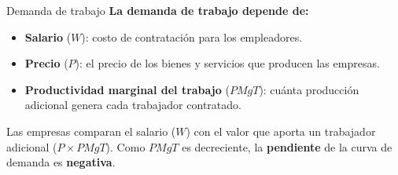\documentclass{beamer}
\begin{document}
\begin{frame}{Demanda de trabajo}
    \footnotesize
    \textbf{La demanda de trabajo depende de:}
    \begin{itemize}
        \item \textbf{Salario} ($W$): costo de contratación para los empleadores.
        \item \textbf{Precio} ($P$): el precio de los bienes y servicios que producen las empresas.
        \item \textbf{Productividad marginal del trabajo} ($PMgT$): cuánta producción adicional genera cada trabajador contratado.
    \end{itemize}
    \centering
    \vspace{0.2cm}
    \begin{minipage}{0.55\textwidth}
        \begin{center}
        \end{center}
    \end{minipage}
\begin{minipage}{0.4\textwidth}
        Las empresas comparan el salario ($W$) con el valor que aporta un trabajador adicional ($P\times PMgT$). Como $PMgT$ es decreciente, la \textbf{pendiente} de la curva de demanda es \textbf{negativa}. 
\end{minipage}

\end{frame}
\end{document}
